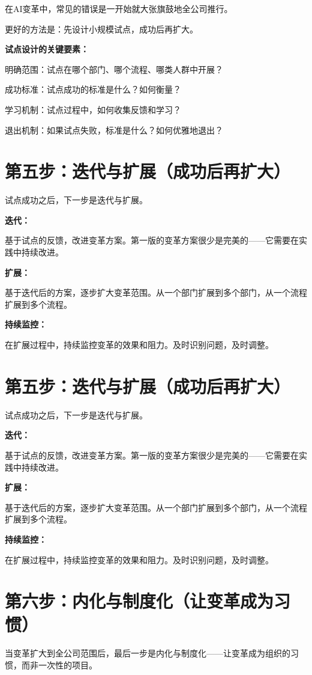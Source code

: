 在AI变革中，常见的错误是一开始就大张旗鼓地全公司推行。

更好的方法是：先设计小规模试点，成功后再扩大。

\textbf{试点设计的关键要素：}

明确范围：试点在哪个部门、哪个流程、哪类人群中开展？

成功标准：试点成功的标准是什么？如何衡量？

学习机制：试点过程中，如何收集反馈和学习？

退出机制：如果试点失败，标准是什么？如何优雅地退出？

\section{第五步：迭代与扩展（成功后再扩大）}


试点成功之后，下一步是迭代与扩展。

\textbf{迭代：}

基于试点的反馈，改进变革方案。第一版的变革方案很少是完美的——它需要在实践中持续改进。

\textbf{扩展：}

基于迭代后的方案，逐步扩大变革范围。从一个部门扩展到多个部门，从一个流程扩展到多个流程。

\textbf{持续监控：}

在扩展过程中，持续监控变革的效果和阻力。及时识别问题，及时调整。

\section{第五步：迭代与扩展（成功后再扩大）}


试点成功之后，下一步是迭代与扩展。

\textbf{迭代：}

基于试点的反馈，改进变革方案。第一版的变革方案很少是完美的——它需要在实践中持续改进。

\textbf{扩展：}

基于迭代后的方案，逐步扩大变革范围。从一个部门扩展到多个部门，从一个流程扩展到多个流程。

\textbf{持续监控：}

在扩展过程中，持续监控变革的效果和阻力。及时识别问题，及时调整。

\section{第六步：内化与制度化（让变革成为习惯）}


当变革扩大到全公司范围后，最后一步是内化与制度化——让变革成为组织的习惯，而非一次性的项目。

